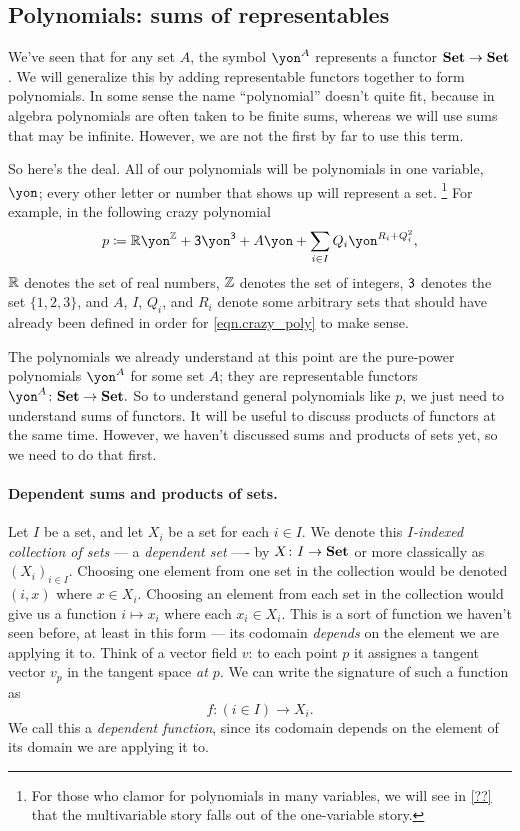\documentclass[DynamicalBook]{subfiles}
\begin{document}
\subsection{Polynomials: sums of representables}

We've seen that for any set $A$, the symbol $\yon^A$ represents a functor $\textbf{Set}\to\textbf{Set}$. We will generalize this by adding representable functors together to form polynomials. In some sense the name ``polynomial'' doesn't quite fit, because in algebra polynomials are often taken to be finite sums, whereas we will use sums that may be infinite. However, we are not the first by far to use this term.

So here's the deal. All of our polynomials will be polynomials in one variable, $\yon$; every other letter or number that shows up will represent a set.%
\footnote{For those who clamor for polynomials in many variables, we will see in \cref{??} that the multivariable story falls out of the one-variable story.}
For example, in the following crazy polynomial
\begin{equation}\label{eqn.crazy_poly}
p\coloneqq\rr\yon^\zz+\3\yon^{\3}+A\yon+\sum_{i\in I}Q_i\yon^{R_i+Q_i^2},
\end{equation}
$\mathbb{R}$ denotes the set of real numbers, $\mathbb{Z}$ denotes the set of integers, $\textsf{3}$ denotes the set $\{1,2,3\}$, and $A$, $I$, $Q_i$, and $R_i$ denote some arbitrary sets that should have already been defined in order for \eqref{eqn.crazy_poly} to make sense.

The polynomials we already understand at this point are the pure-power polynomials $\yon^A$ for some set $A$; they are representable functors $\yon^A\colon\smset\to\smset.$
So to understand general polynomials like $p$, we just need to understand sums of functors. It will be useful to discuss products of functors at the same time. However, we haven't discussed sums and products of sets yet, so we need to do that first.

\paragraph{Dependent sums and products of sets.}

Let $I$ be a set, and let $X_i$ be a set for each $i\in I$. We denote this
\emph{$I$-indexed collection of sets} --- a \emph{dependent set} ---- by $X\colon I\to\textbf{Set}$ or more
classically as $(X_i)_{i\in I}$. Choosing one element from one set in the
collection would be denoted $(i,x)$ where $x\in X_i$. Choosing an element from
each set in the collection would give us a function $i \mapsto x_i$ where each
$x_i\in X_i$. This is a sort of function we haven't seen before, at least in
this form --- its codomain \emph{depends} on the element we are applying it to.
Think of a vector field $v$: to each point $p$ it assignes a tangent vector
$v_p$ in the tangent space \emph{at $p$}. We can write the signature of such a
function as
$$f : (i \in I) \to X_i.$$
We call this a \emph{dependent function}, since its codomain depends on the
element of its domain we are applying it to.
\end{document}
